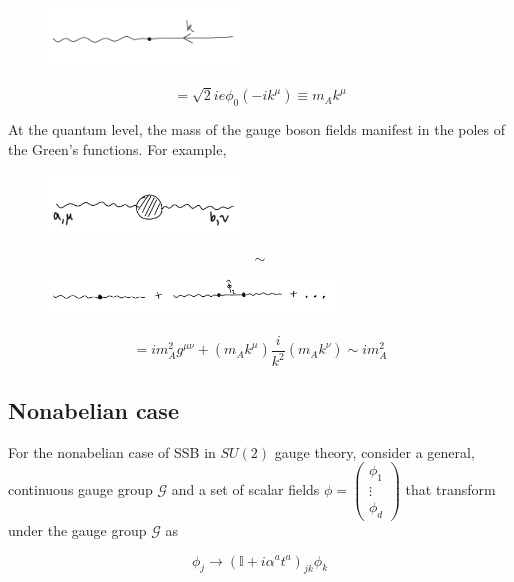\begin{figure}[H]\centering\includegraphics[width=2in]{images/ex_vertex.png} \end{figure} 
\begin{equation} = \sqrt{2} i e \phi_0 (-i k^\mu) \equiv m_A k^\mu \end{equation}

\noindent At the quantum level, the mass of the gauge boson fields manifest in the poles of the Green's functions. For example,


\begin{figure}[H]
	\centering
	\includegraphics[width=2in]{images/gauge_boson_poles.png}
\end{figure} 
$$\sim$$
\begin{figure}[H]
	\centering
	\includegraphics[width=3in]{images/gauge_boson_vertices.png}\end{figure} 
 \begin{equation} 
 = i m_A^2 g^{\mu\nu} + (m_A k^\mu) \frac{i}{k^2} (m_A k^\nu) \sim i m_A^2 
 \end{equation}
 
 \subsection*{Nonabelian case}
 
 \noindent For the nonabelian case of SSB in $SU(2)$ gauge theory, consider a general, continuous gauge group $\mathcal{G}$ and a set of scalar fields $\phi = \begin{pmatrix} \phi_1 \\ \vdots \\ \phi_d \end{pmatrix}$ that transform under the gauge group $\mathcal{G}$ as
 
 \begin{equation}
 \phi_j \rightarrow (\mathbb{I} + i \alpha^a t^a )_{jk} \phi_k
 \end{equation}
 
